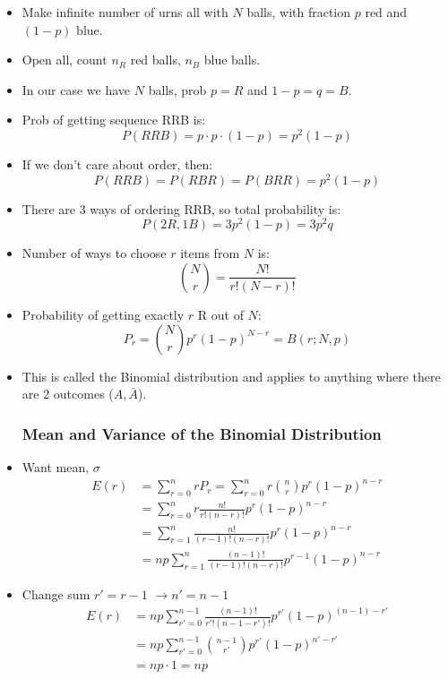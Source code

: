 \begin{itemize}
      \item Make infinite number of urns all with $N$ balls, with fraction $p$ red and $(1-p)$ blue.
      \item Open all, count $n_R$ red balls, $n_B$ blue balls.
      \item In our case we have $N$ balls, prob $p=R$ and $1-p=q=B$.
      \item Prob of getting sequence RRB is:
            \[ P(RRB) = p \cdot p \cdot (1-p) = p^2 (1-p) \]
      \item If we don't care about order, then:
            \[ P(RRB) = P(RBR) = P(BRR) = p^2 (1-p) \]
      \item There are 3 ways of ordering RRB, so total probability is:
            \[ P(2R,1B) = 3 p^2 (1-p) = 3 p^2 q \]
      \item Number of ways to choose $r$ items from $N$ is:
            \[ \binom{N}{r} = \frac{N!}{r!(N-r)!} \]
      \item Probability of getting exactly $r$ R out of $N$:
            \[ P_r = \binom{N}{r} p^r (1-p)^{N-r} = B(r;N,p) \]
      \item This is called the Binomial distribution and applies to anything where there are 2 outcomes ($A, \bar{A}$).

            \subsubsection*{Mean and Variance of the Binomial Distribution}

      \item Want mean, $\sigma$
            \begin{align*}
                  E(r) & = \sum_{r=0}^n r P_r = \sum_{r=0}^n r \binom{n}{r} p^r (1-p)^{n-r} \\
                       & = \sum_{r=0}^n r \frac{n!}{r!(n-r)!} p^r (1-p)^{n-r}               \\
                       & = \sum_{r=1}^n \frac{n!}{(r-1)!(n-r)!} p^r (1-p)^{n-r}             \\
                       & = np \sum_{r=1}^n \frac{(n-1)!}{(r-1)!(n-r)!} p^{r-1} (1-p)^{n-r}
            \end{align*}
      \item Change sum $r' = r-1$ $\rightarrow n' = n-1$
            \begin{align*}
                  E(r) & = np \sum_{r'=0}^{n-1} \frac{(n-1)!}{r'!(n-1-r')!} p^{r'} (1-p)^{(n-1)-r'} \\
                       & = np \sum_{r'=0}^{n-1} \binom{n-1}{r'} p^{r'} (1-p)^{n'-r'}                \\
                       & = np \cdot 1 = np
            \end{align*}


\end{itemize}
